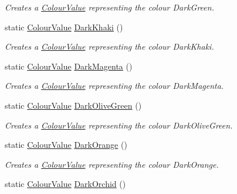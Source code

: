 \begin{DoxyCompactItemize}
\begin{DoxyCompactList}\small\item\em Creates a \hyperlink{classMezzanine_1_1ColourValue}{ColourValue} representing the colour DarkGreen. \item\end{DoxyCompactList}\item 
static \hyperlink{classMezzanine_1_1ColourValue}{ColourValue} \hyperlink{classMezzanine_1_1ColourValue_a290250f9860696a283f1a5a3d15745e8}{DarkKhaki} ()
\begin{DoxyCompactList}\small\item\em Creates a \hyperlink{classMezzanine_1_1ColourValue}{ColourValue} representing the colour DarkKhaki. \item\end{DoxyCompactList}\item 
static \hyperlink{classMezzanine_1_1ColourValue}{ColourValue} \hyperlink{classMezzanine_1_1ColourValue_a3a01ba9640e1428041a3bb0ef78cc18f}{DarkMagenta} ()
\begin{DoxyCompactList}\small\item\em Creates a \hyperlink{classMezzanine_1_1ColourValue}{ColourValue} representing the colour DarkMagenta. \item\end{DoxyCompactList}\item 
static \hyperlink{classMezzanine_1_1ColourValue}{ColourValue} \hyperlink{classMezzanine_1_1ColourValue_af2c4fb3ca9de4d71ae254b9d90c6e629}{DarkOliveGreen} ()
\begin{DoxyCompactList}\small\item\em Creates a \hyperlink{classMezzanine_1_1ColourValue}{ColourValue} representing the colour DarkOliveGreen. \item\end{DoxyCompactList}\item 
static \hyperlink{classMezzanine_1_1ColourValue}{ColourValue} \hyperlink{classMezzanine_1_1ColourValue_af552a85a94a473211f1453be8751d5db}{DarkOrange} ()
\begin{DoxyCompactList}\small\item\em Creates a \hyperlink{classMezzanine_1_1ColourValue}{ColourValue} representing the colour DarkOrange. \item\end{DoxyCompactList}\item 
static \hyperlink{classMezzanine_1_1ColourValue}{ColourValue} \hyperlink{classMezzanine_1_1ColourValue_afc1bfd7d946677fe3d6bb30bc20ac3d1}{DarkOrchid} ()

\end{DoxyCompactItemize}
